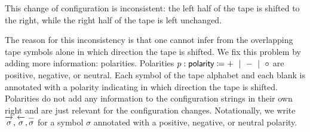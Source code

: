 \begin{example}
\begin{center}
  \end{center}
  This change of configuration is inconsistent: the left half of the tape is shifted to the right, while the right half of the tape is left unchanged.
\end{example}

The reason for this inconsistency is that one cannot infer from the overlapping tape symbols alone in which direction the tape is shifted. 
We fix this problem by adding more information: polarities. Polarities $p : \textsf{polarity}{} \coloneqq + ~\mid~ - ~\mid~ \circ{}$ are positive, negative, or neutral. 
Each symbol of the tape alphabet and each blank is annotated with a polarity indicating in which direction the tape is shifted. Polarities do not add any information to the configuration strings in their own right and are just relevant for the configuration changes.
Notationally, we write $\polpos{\sigma}, \polneg{\sigma}, \polneut{\sigma}$ for a symbol $\sigma$ annotated with a positive, negative, or neutral polarity.

